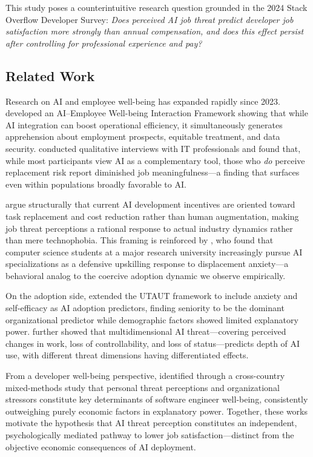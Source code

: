 \documentclass[11pt]{article}
\begin{document}
This study poses a counterintuitive research question grounded in the 2024 Stack Overflow
Developer Survey: \emph{Does perceived AI job threat predict developer job satisfaction
more strongly than annual compensation, and does this effect persist after controlling for
professional experience and pay?}

\subsection{Related Work}

Research on AI and employee well-being has expanded rapidly since 2023.
\citet{sadeghi2024} developed an AI--Employee Well-being Interaction Framework showing
that while AI integration can boost operational efficiency, it simultaneously generates
apprehension about employment prospects, equitable treatment, and data security.
\citet{ghosh2024} conducted qualitative interviews with IT professionals and found that,
while most participants view AI as a complementary tool, those who \emph{do} perceive
replacement risk report diminished job meaningfulness---a finding that surfaces even within
populations broadly favorable to AI.

\citet{constantinides2025} argue structurally that current AI development incentives are
oriented toward task replacement and cost reduction rather than human augmentation, making
job threat perceptions a rational response to actual industry dynamics rather than mere
technophobia. This framing is reinforced by \citet{farooqi2026}, who found that computer
science students at a major research university increasingly pursue AI specializations as a
defensive upskilling response to displacement anxiety---a behavioral analog to the coercive
adoption dynamic we observe empirically.

On the adoption side, \citet{wolfe2025} extended the UTAUT framework to include anxiety
and self-efficacy as AI adoption predictors, finding seniority to be the dominant
organizational predictor while demographic factors showed limited explanatory power.
\citet{reich2026} further showed that multidimensional AI threat---covering perceived
changes in work, loss of controllability, and loss of status---predicts depth of AI use,
with different threat dimensions having differentiated effects.

From a developer well-being perspective, \citet{martinez2025} identified through a
cross-country mixed-methods study that personal threat perceptions and organizational
stressors constitute key determinants of software engineer well-being, consistently
outweighing purely economic factors in explanatory power. Together, these works motivate
the hypothesis that AI threat perception constitutes an independent, psychologically
mediated pathway to lower job satisfaction---distinct from the objective economic
consequences of AI deployment.
\end{document}
